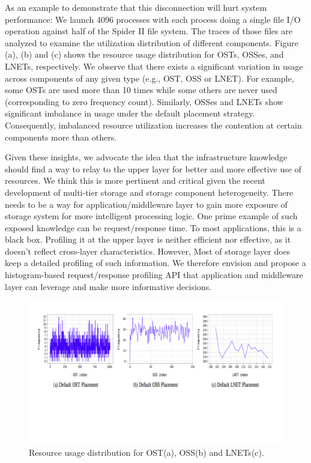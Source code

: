 As an example to demonstrate that this disconnection will hurt system performance: We launch 4096 processes with each process doing a single file I/O operation against half of the Spider II file system. The traces of those files are analyzed to examine the utilization distribution of different components. Figure (a), (b) and (c) shows the resource usage distribution for OSTs, OSSes, and LNETs, respectively. We observe that there exists a significant variation in usage across components of any given type (e.g., OST, OSS or LNET). For example, some OSTs are used more than 10 times while some others are never used (corresponding to zero frequency count). Similarly, OSSes and LNETs show significant imbalance in usage under the default placement strategy. Consequently, imbalanced resource utilization increases the contention at certain components more than others. 

Given these insights, we advocate the idea that the infrastructure knowledge should find a way to relay to the upper layer for better and more effective use of resources.   We think this is more pertinent and critical given the recent development of multi-tier storage and storage component heterogeneity.  There needs to be a way for application/middleware layer to gain more exposure of storage system for more intelligent processing logic.  One prime example of such exposed knowledge can be request/response time. To most applications, this is a black box. Profiling it at the upper layer is neither efficient nor effective, as it doesn't reflect cross-layer characteristics. However, Most of storage layer does keep a detailed profiling of such information. We therefore envision and propose a histogram-based request/response profiling API that application and middleware layer can leverage and make more informative decisions.

\begin{figure}[tbh]
  \centering
  \includegraphics[width=\columnwidth]{graphics/infrastructure.pdf}\vspace{-1.2in}
  \caption{Resource usage distribution for OST(a), OSS(b) and LNETs(c). }
\end{figure}


